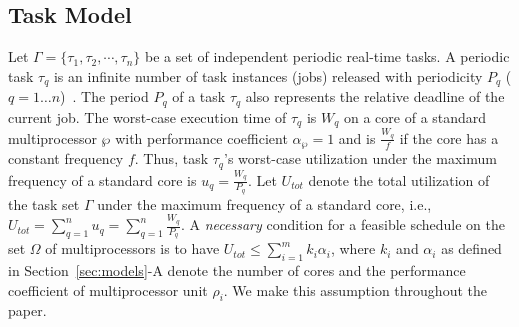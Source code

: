 \documentclass[conference]{IEEEtran}
\begin{document}



\subsection{Task Model}

Let  $\Gamma = \{\tau_1, \tau_2, \cdots, \tau_n\}$ be  a set of independent periodic real-time tasks.
A periodic task $\tau_q$ is an infinite number of task instances (jobs) released with periodicity $P_q$ ($q=1\ldots n$)~\cite{Liu00}.
The period $P_q$ of a task $\tau_q$
also represents the relative deadline of the current job.
The worst-case execution time of $\tau_q$ is $W_q$ on a core of a standard multiprocessor $\wp$ with performance coefficient $\alpha_{\wp}=1$ and is
$\frac{W_q}{f}$ if the core has a constant frequency $f$.
Thus, task $\tau_q$'s worst-case utilization under the maximum frequency of a standard core is
$u_q = \frac{W_q}{P_q}$.
Let $U_{tot}$ denote the total
utilization of the task set $\Gamma$ under the maximum frequency of a standard core, i.e., $U_{tot} = \sum_{q=1}^{n} u_q = \sum_{q=1}^{n} \frac{W_q}{P_q}$.
A \emph{necessary} condition for a feasible schedule on the set $\Omega$ of multiprocessors is to have
$U_{tot} \leq  \sum_{i=1}^{m} k_i \alpha_i $, where $k_i$ and $\alpha_i$ as defined in Section~\ref{sec:models}-A denote the number of cores and the performance coefficient of multiprocessor unit $\rho_i$.
We make this assumption throughout the paper.
%
%
\end{document}
